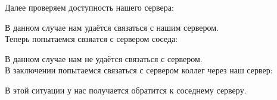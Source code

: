\documentclass[a4paper,12pt]{article}
\begin{document}
Далее проверяем доступность нашего сервера:
\begin{figure}[H]
\end{figure}
В данном случае нам удаётся связаться с нашим сервером.\\
Теперь попытаемся свзяатся с сервером соседа:
\begin{figure}[H]
\end{figure}
В данном случае нам не удаётся связаться с сервером.\\
В заключении попытаемся связаться с сервером коллег через наш сервер:
\begin{figure}[H]
\end{figure}
В этой ситуации у нас получается обратится к соседнему серверу.
\end{document}
